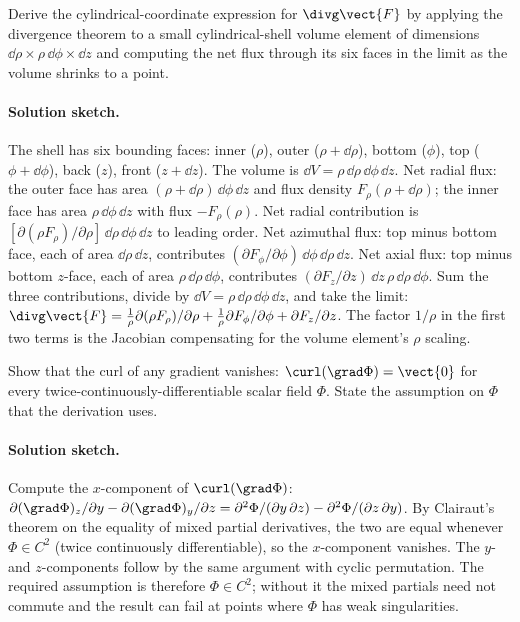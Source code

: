 \begin{exercise}
Derive the cylindrical-coordinate expression for $\divg\vect{F}$ by
applying the divergence theorem to a small cylindrical-shell volume
element of dimensions $\dd\rho \times \rho\,\dd\phi \times \dd z$
and computing the net flux through its six faces in the limit as the
volume shrinks to a point.

\paragraph{Solution sketch.} The shell has six bounding faces:
inner ($\rho$), outer ($\rho + \dd\rho$), bottom ($\phi$), top
($\phi + \dd\phi$), back ($z$), front ($z + \dd z$). The volume is
$\dd V = \rho\,\dd\rho\,\dd\phi\,\dd z$. Net radial flux: the outer
face has area $(\rho + \dd\rho)\,\dd\phi\,\dd z$ and flux density
$F_{\rho}(\rho + \dd\rho)$; the inner face has area $\rho\,\dd\phi
\,\dd z$ with flux $-F_{\rho}(\rho)$. Net radial contribution is
$[\partial(\rho F_{\rho})/\partial\rho]\,\dd\rho\,\dd\phi\,\dd z$
to leading order. Net azimuthal flux: top minus bottom face,
each of area $\dd\rho\,\dd z$, contributes $(\partial F_{\phi}/
\partial\phi)\,\dd\phi\,\dd\rho\,\dd z$. Net axial flux: top
minus bottom $z$-face, each of area $\rho\,\dd\rho\,\dd\phi$,
contributes $(\partial F_{z}/\partial z)\,\dd z\,\rho\,\dd\rho
\,\dd\phi$. Sum the three contributions, divide by $\dd V = \rho
\,\dd\rho\,\dd\phi\,\dd z$, and take the limit: $\divg\vect{F} =
\frac{1}{\rho}\partial(\rho F_{\rho})/\partial\rho + \frac{1}{\rho}
\partial F_{\phi}/\partial\phi + \partial F_{z}/\partial z$. The
factor $1/\rho$ in the first two terms is the Jacobian compensating
for the volume element's $\rho$ scaling.
\end{exercise}

\begin{exercise}
Show that the curl of any gradient vanishes: $\curl(\grad\Phi) =
\vect{0}$ for every twice-continuously-differentiable scalar field
$\Phi$. State the assumption on $\Phi$ that the derivation uses.

\paragraph{Solution sketch.} Compute the $x$-component of $\curl
(\grad\Phi)$: $\partial(\grad\Phi)_{z}/\partial y - \partial(\grad
\Phi)_{y}/\partial z = \partial^{2}\Phi/(\partial y\,\partial z) -
\partial^{2}\Phi/(\partial z\,\partial y)$. By Clairaut's theorem on
the equality of mixed partial derivatives, the two are equal
whenever $\Phi \in C^{2}$ (twice continuously differentiable), so
the $x$-component vanishes. The $y$- and $z$-components follow by
the same argument with cyclic permutation. The required assumption
is therefore $\Phi \in C^{2}$; without it the mixed partials need
not commute and the result can fail at points where $\Phi$ has weak
singularities.
\end{exercise}

